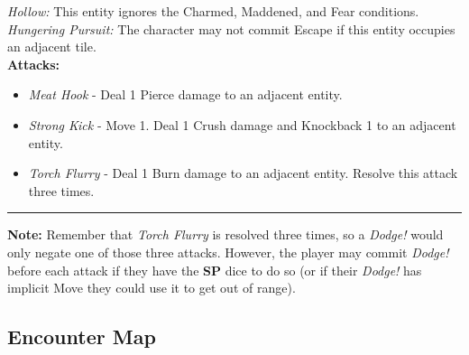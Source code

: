 \emph{Hollow:} This entity ignores the Charmed, Maddened, and Fear conditions.\\

\emph{Hungering Pursuit:} The character may not commit Escape if this entity occupies an adjacent tile.\\

\textbf{Attacks:}
\begin{itemize}
\item \emph{Meat Hook} - Deal 1 Pierce damage to an adjacent entity.
\item \emph{Strong Kick} - Move 1. Deal 1 Crush damage and Knockback 1 to an adjacent entity.
\item \emph{Torch Flurry} - Deal 1 Burn damage to an adjacent entity. Resolve this attack three times.
\end{itemize}
\hrule

\begin{tcolorbox}
\textbf{Note:} Remember that \emph{Torch Flurry} is resolved three times, so a \emph{Dodge!} would only negate one of those three attacks. However, the player may commit \emph{Dodge!} before each attack if they have the \textbf{SP} dice to do so (or if their \emph{Dodge!} has implicit Move they could use it to get out of range).
\end{tcolorbox}

\subsection*{Encounter Map}

\begin{center}
\end{center}

